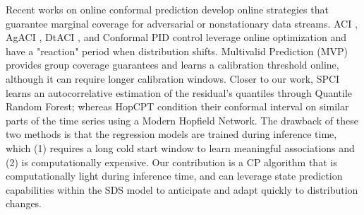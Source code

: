 Recent works on online conformal prediction develop online strategies that guarantee marginal coverage for adversarial or nonstationary data streams. ACI \citep{gibbs2021adaptive}, AgACI \citep{zaffran2022adaptive}, DtACI \citep{gibbs2024conformal}, and Conformal PID control \citep{angelopoulos2024pid}  leverage online optimization and have a "reaction" period when distribution shifts. Multivalid Prediction (MVP) \citep{bastani2022practical} provides group coverage guarantees and learns a calibration threshold online, although it can require longer calibration windows. Closer to our work, SPCI \citep{xu2023sequential} learns an autocorrelative estimation of the residual's quantiles through Quantile Random Forest; whereas HopCPT \citep{auer2023hopcpt} condition their conformal interval on similar parts of the time series using a Modern Hopfield Network. The drawback of these two methods is that the regression models are trained during inference time, which (1) requires a long cold start window to learn meaningful associations and (2) is computationally expensive. 
%
Our contribution is a CP algorithm that is computationally light during inference time, and can leverage state prediction capabilities within the SDS model to anticipate and adapt quickly to distribution changes.









